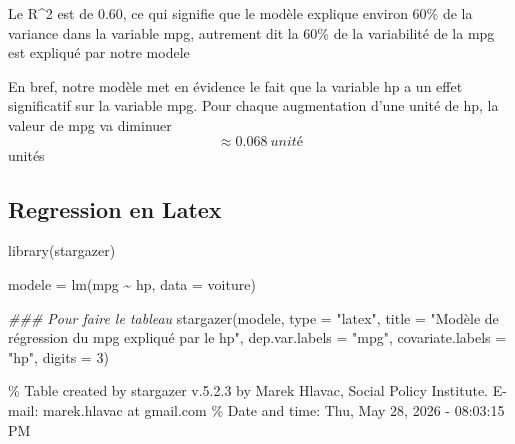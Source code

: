 \documentclass{article}
\newenvironment{Shaded}{\begin{snugshade}}{\end{snugshade}}
\newcommand{\AttributeTok}[1]{\textcolor[rgb]{0.40,0.45,0.13}{#1}}
\newcommand{\DecValTok}[1]{\textcolor[rgb]{0.68,0.00,0.00}{#1}}
\newcommand{\DocumentationTok}[1]{\textcolor[rgb]{0.37,0.37,0.37}{\textit{#1}}}
\newcommand{\FunctionTok}[1]{\textcolor[rgb]{0.28,0.35,0.67}{#1}}
\newcommand{\NormalTok}[1]{\textcolor[rgb]{0.00,0.23,0.31}{#1}}
\newcommand{\OtherTok}[1]{\textcolor[rgb]{0.00,0.23,0.31}{#1}}
\newcommand{\SpecialCharTok}[1]{\textcolor[rgb]{0.37,0.37,0.37}{#1}}
\newcommand{\StringTok}[1]{\textcolor[rgb]{0.13,0.47,0.30}{#1}}
\begin{document}
Le R\^{}2 est de 0.60, ce qui signifie que le modèle explique environ
60\% de la variance dans la variable mpg, autrement dit la 60\% de la
variabilité de la mpg est expliqué par notre modele

En bref, notre modèle met en évidence le fait que la variable hp a un
effet significatif sur la variable mpg. Pour chaque augmentation d'une
unité de hp, la valeur de mpg va diminuer \[ \approx 0.068\ unité\]
unités

\subsection{Regression en Latex}\label{regression-en-latex}

\begin{Shaded}
\begin{Highlighting}[]
\FunctionTok{library}\NormalTok{(stargazer)}

\NormalTok{modele }\OtherTok{=} \FunctionTok{lm}\NormalTok{(mpg }\SpecialCharTok{\textasciitilde{}}\NormalTok{ hp, }\AttributeTok{data =}\NormalTok{ voiture)}

\DocumentationTok{\#\#\# Pour faire le tableau }
\FunctionTok{stargazer}\NormalTok{(modele,}
          \AttributeTok{type =} \StringTok{"latex"}\NormalTok{,}
          \AttributeTok{title =} \StringTok{"Modèle de régression du mpg expliqué par le hp"}\NormalTok{,}
          \AttributeTok{dep.var.labels =} \StringTok{"mpg"}\NormalTok{,}
          \AttributeTok{covariate.labels =} \StringTok{"hp"}\NormalTok{,}
          \AttributeTok{digits =} \DecValTok{3}\NormalTok{)}
\end{Highlighting}
\end{Shaded}

\% Table created by stargazer v.5.2.3 by Marek Hlavac, Social Policy
Institute. E-mail: marek.hlavac at gmail.com \% Date and time: Thu, May
28, 2026 - 08:03:15 PM
\end{document}
